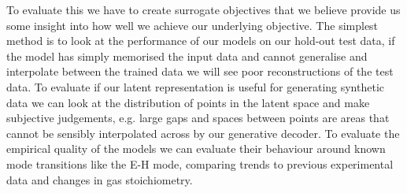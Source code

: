 \documentclass[10pt]{iopart}
\begin{document}
To evaluate this we have to create surrogate objectives that we believe provide us some insight into how well we achieve our underlying objective. The simplest method is to look at the performance of our models on our hold-out test data, if the model has simply memorised the input data and cannot generalise and interpolate between the trained data we will see poor reconstructions of the test data. To evaluate if our latent representation is useful for generating synthetic data we can look at the distribution of points in the latent space and make subjective judgements, e.g. large gaps and spaces between points are areas that cannot be sensibly interpolated across by our generative decoder. To evaluate the empirical quality of the models we can evaluate their behaviour around known mode transitions like the E-H mode, comparing trends to previous experimental data and changes in gas stoichiometry. 



\end{document}
